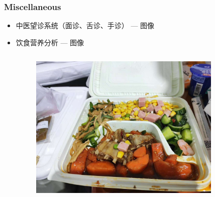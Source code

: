 \begin{frame}
\frametitle{Miscellaneous}

\begin{itemize}
    \item<2-> 中医望诊系统（面诊、舌诊、手诊） --- 图像
    \item<3-> 饮食营养分析 --- 图像
    \begin{columns}
    \begin{column}{0.5\textwidth}
    \begin{figure}
        \centering
        \includegraphics[width=1\textwidth,keepaspectratio]{images/diet_img.jpg}
    \end{figure}
    \end{column}
    \begin{column}{0.27\textwidth}
    \begin{figure}
        \centering

\end{figure}
\end{column}
\end{columns}
\end{itemize}
\end{frame}
